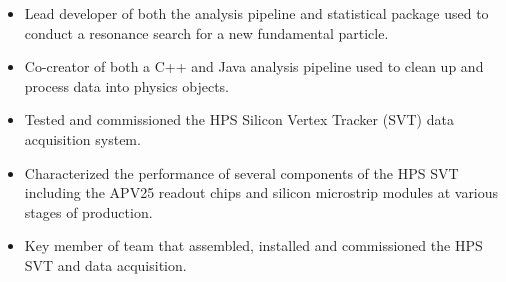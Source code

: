 \documentclass[11pt]{article}
\begin{document}
                        {   
                            \begin{itemize}[label=\textcolor{indigodye}{$\circ$}, noitemsep, nolistsep, leftmargin=0.19\textwidth]
                                \item Lead developer of both the analysis pipeline and statistical package
                                      used to conduct a resonance search for a new fundamental particle.
                              \item Co-creator of both a C++ and Java analysis pipeline used to clean up and process
                                    data into physics objects.
                              \item Tested and commissioned the HPS Silicon Vertex Tracker (SVT) data
                                    acquisition system.
                              \item Characterized the performance of several components of the HPS SVT
                                    including the APV25 readout chips and silicon microstrip modules at various stages
                                    of production.
                              \item Key member of team that assembled, installed and commissioned the HPS SVT
                                    and data acquisition.
                          \end{itemize} 
                      } 
\end{document}
